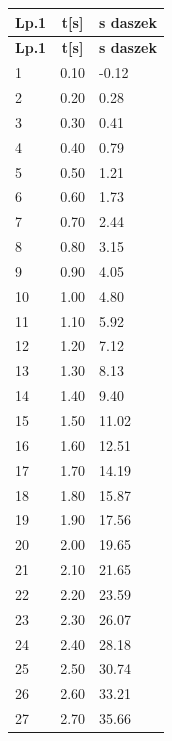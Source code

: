 \documentclass{article}
\begin{document}
\begin{longtable}{|l|l|l|}

\hline \multicolumn{1}{|c|}{\textbf{Lp.1}} & \multicolumn{1}{c|}{\textbf{t[s]}} & \multicolumn{1}{c|}{\textbf{s daszek}} \\ \hline 
\endfirsthead

\hline \multicolumn{1}{|c|}{\textbf{Lp.1}} & \multicolumn{1}{c|}{\textbf{t[s]}} & \multicolumn{1}{c|}{\textbf{s daszek}} \\ \hline 
\endhead



        1 & 0.10 & -0.12 \\ \hline
        2 & 0.20 & 0.28 \\ \hline
        3 & 0.30 & 0.41 \\ \hline
        4 & 0.40 & 0.79 \\ \hline
        5 & 0.50 & 1.21 \\ \hline
        6 & 0.60 & 1.73 \\ \hline
        7 & 0.70 & 2.44 \\ \hline
        8 & 0.80 & 3.15 \\ \hline
        9 & 0.90 & 4.05 \\ \hline
        10 & 1.00 & 4.80 \\ \hline
        11 & 1.10 & 5.92 \\ \hline
        12 & 1.20 & 7.12 \\ \hline
        13 & 1.30 & 8.13 \\ \hline
        14 & 1.40 & 9.40 \\ \hline
        15 & 1.50 & 11.02 \\ \hline
        16 & 1.60 & 12.51 \\ \hline
        17 & 1.70 & 14.19 \\ \hline
        18 & 1.80 & 15.87 \\ \hline
        19 & 1.90 & 17.56 \\ \hline
        20 & 2.00 & 19.65 \\ \hline
        21 & 2.10 & 21.65 \\ \hline
        22 & 2.20 & 23.59 \\ \hline
        23 & 2.30 & 26.07 \\ \hline
        24 & 2.40 & 28.18 \\ \hline
        25 & 2.50 & 30.74 \\ \hline
        26 & 2.60 & 33.21 \\ \hline
        27 & 2.70 & 35.66 \\ \hline

\end{longtable}
\end{document}

